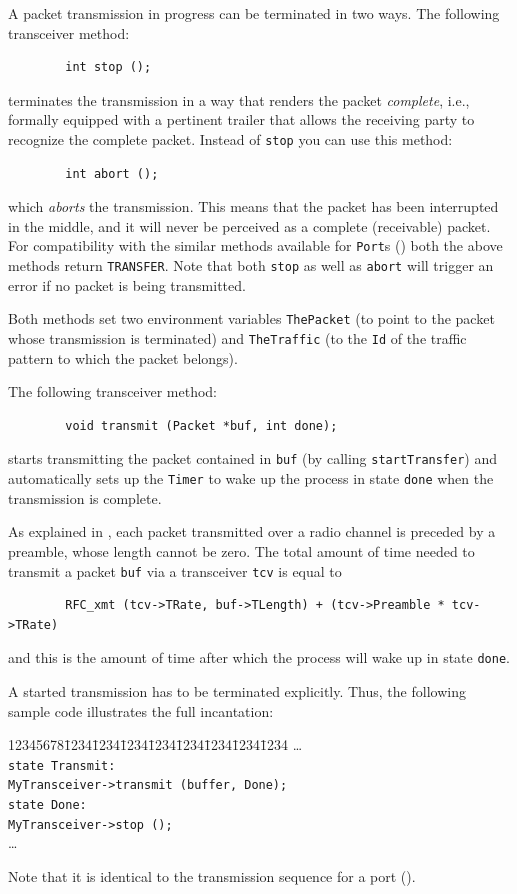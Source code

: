 A packet transmission in progress can be terminated in two ways.
The following transceiver method:
\begin{verbatim}
        int stop ();
\end{verbatim}
\noindent
terminates the transmission in a way that renders the
packet {\em complete}, i.e., formally
equipped with a pertinent trailer that allows the receiving party to
recognize the complete packet.
Instead of {\tt stop} you can use this method:
\begin{verbatim}
        int abort ();
\end{verbatim}
which {\em aborts\/} the transmission.
This means that the packet has been interrupted in the middle,
and it will never be perceived as a complete (receivable) packet.
For compatibility with the similar methods available for {\tt Port}s
() both the above methods return {\tt TRANSFER}.
Note that both {\tt stop} as well as {\tt abort} will trigger an error
if no packet is being transmitted.

Both methods set two environment variables {\tt ThePacket}
(to point to the packet whose transmission is terminated)
and {\tt TheTraffic} (to the
{\tt Id} of the traffic pattern to which the packet belongs).

\medskip

The following transceiver method:
\begin{verbatim}
        void transmit (Packet *buf, int done);
\end{verbatim}
starts transmitting the packet contained in {\tt buf} (by calling
{\tt startTransfer}) and automatically
sets up the {\tt Timer} to wake up the process in state {\tt done} when the
transmission is complete.

As explained in , each packet transmitted over a
radio channel is preceded by a preamble, whose length cannot be zero.
The total amount of time needed to transmit a packet {\tt buf} via a
transceiver {\tt tcv} is equal to
\begin{verbatim}
        RFC_xmt (tcv->TRate, buf->TLength) + (tcv->Preamble * tcv->TRate)
\end{verbatim}
\noindent
and this is the amount of time after which the process will wake up
in state {\tt done}.

A started transmission has to be terminated explicitly.
Thus, the following sample code illustrates the full incantation:
{\tt\begin{tabbing}
12345678\=1234\=1234\=1234\=1234\=1234\=1234\=1234\=1234\kill
\> \ldots \\
\> {\tt state Transmit:}\\
\> \> {\tt MyTransceiver->transmit (buffer, Done);}\\
\> {\tt state Done:}\\
\> \> {\tt MyTransceiver->stop ();}\\
\> \>\ldots
\end{tabbing}}
\noindent
Note that it is identical to the transmission sequence for a port
().

